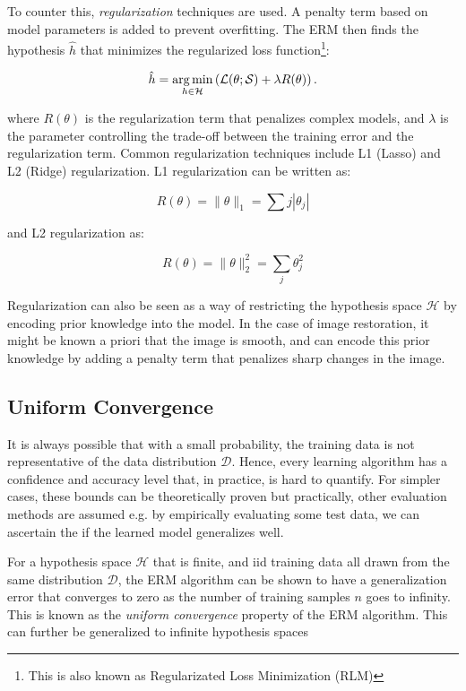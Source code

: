 To counter this, \textit{regularization} techniques are used. A penalty term based on model parameters is added to prevent overfitting. The \gls{ERM} then finds the hypothesis $\hat{h}$ that minimizes the regularized loss function\footnote{This is also known as Regularizated Loss Minimization (RLM)}:

\begin{equation}
    \hat{h} = \operatorname*{arg\,min}_{h \in \mathcal{H}} \left(\mathcal{L}(\theta; \mathcal{S})  + \lambda R(\theta) \right).
\end{equation}

where $R(\theta)$ is the regularization term that penalizes complex models, and $\lambda$ is the parameter controlling the trade-off between the training error and the regularization term. Common regularization techniques include L1 (Lasso) and L2 (Ridge) regularization. L1 regularization can be written as:

\begin{equation*}
    R(\theta) = \|\theta\|_1 = \sum{j} |\theta_j|
\end{equation*}

and L2 regularization as:

\begin{equation*}
    R(\theta) = \|\theta\|^2_2 = \sum_{j} \theta_j^2
\end{equation*}

Regularization can also be seen as a way of restricting the hypothesis space $\mathcal{H}$ by encoding prior knowledge into the model. In the case of image restoration, it might be known a priori that the image is smooth, and  can encode this prior knowledge by adding a penalty term that penalizes sharp changes in the image.


\subsection{Uniform Convergence}
It is always possible that with a small probability, the training data is not representative of the data distribution $\mathcal{D}$. Hence, every learning algorithm has a confidence and accuracy level that, in practice, is hard to quantify. For simpler cases, these bounds can be theoretically proven but practically, other evaluation methods are assumed e.g. by empirically evaluating some test data, we can ascertain the if the learned model generalizes well.

For a hypothesis space $\mathcal{H}$ that is finite, and \gls{iid} training data all drawn from the same distribution $\mathcal{D}$, the \gls{ERM} algorithm can be shown to have a generalization error that converges to zero as the number of training samples $n$ goes to infinity. This is known as the \textit{uniform convergence} property of the \gls{ERM} algorithm. This can further be generalized to infinite hypothesis spaces 


